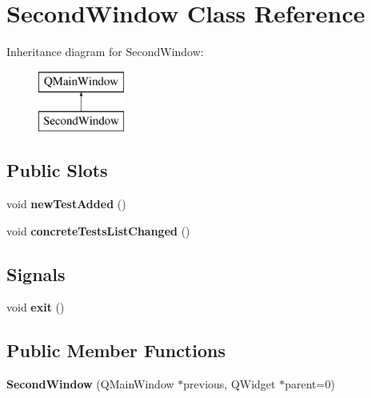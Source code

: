 \hypertarget{class_second_window}{}\section{Second\+Window Class Reference}
\label{class_second_window}
Inheritance diagram for Second\+Window\+:\begin{figure}[H]
\begin{center}
\leavevmode
\includegraphics[height=2.000000cm]{class_second_window}
\end{center}
\end{figure}
\subsection*{Public Slots}
\begin{DoxyCompactItemize}
\item 
\mbox{\label{class_second_window_a594bef6aa46da4e07b90e32152b3bb65}} 
void {\bfseries new\+Test\+Added} ()
\item 
\mbox{\label{class_second_window_a90fddca2bd2958b6da55c9ecf5729294}} 
void {\bfseries concrete\+Tests\+List\+Changed} ()
\end{DoxyCompactItemize}
\subsection*{Signals}
\begin{DoxyCompactItemize}
\item 
\mbox{\label{class_second_window_a54db352808d659d6871695e19b1b58ad}} 
void {\bfseries exit} ()
\end{DoxyCompactItemize}
\subsection*{Public Member Functions}
\begin{DoxyCompactItemize}
\item 
\mbox{\label{class_second_window_afe3ae7cd5e45f9c75127a78b6cce3420}} 
{\bfseries Second\+Window} (Q\+Main\+Window $\ast$previous, Q\+Widget $\ast$parent=0)
\end{DoxyCompactItemize}


